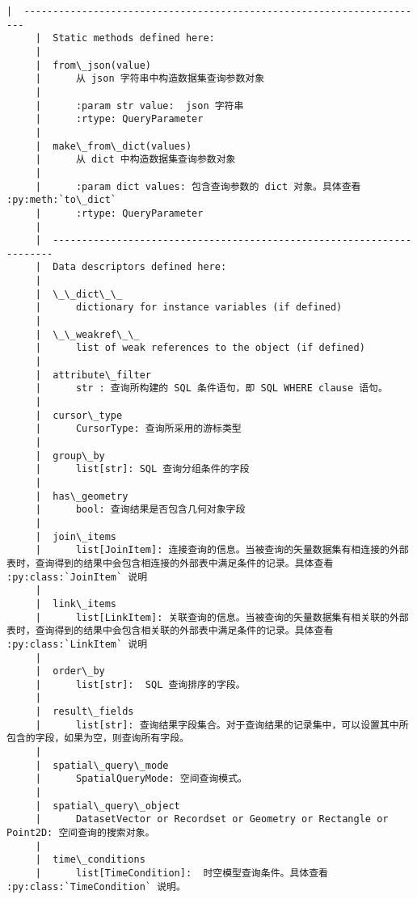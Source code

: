 \documentclass[11pt]{article}
\begin{document}
\begin{Verbatim}[commandchars=\\\{\}]
     |  ----------------------------------------------------------------------
     |  Static methods defined here:
     |  
     |  from\_json(value)
     |      从 json 字符串中构造数据集查询参数对象
     |      
     |      :param str value:  json 字符串
     |      :rtype: QueryParameter
     |  
     |  make\_from\_dict(values)
     |      从 dict 中构造数据集查询参数对象
     |      
     |      :param dict values: 包含查询参数的 dict 对象。具体查看 :py:meth:`to\_dict`
     |      :rtype: QueryParameter
     |  
     |  ----------------------------------------------------------------------
     |  Data descriptors defined here:
     |  
     |  \_\_dict\_\_
     |      dictionary for instance variables (if defined)
     |  
     |  \_\_weakref\_\_
     |      list of weak references to the object (if defined)
     |  
     |  attribute\_filter
     |      str : 查询所构建的 SQL 条件语句，即 SQL WHERE clause 语句。
     |  
     |  cursor\_type
     |      CursorType: 查询所采用的游标类型
     |  
     |  group\_by
     |      list[str]: SQL 查询分组条件的字段
     |  
     |  has\_geometry
     |      bool: 查询结果是否包含几何对象字段
     |  
     |  join\_items
     |      list[JoinItem]: 连接查询的信息。当被查询的矢量数据集有相连接的外部表时，查询得到的结果中会包含相连接的外部表中满足条件的记录。具体查看 :py:class:`JoinItem` 说明
     |  
     |  link\_items
     |      list[LinkItem]: 关联查询的信息。当被查询的矢量数据集有相关联的外部表时，查询得到的结果中会包含相关联的外部表中满足条件的记录。具体查看 :py:class:`LinkItem` 说明
     |  
     |  order\_by
     |      list[str]:  SQL 查询排序的字段。
     |  
     |  result\_fields
     |      list[str]: 查询结果字段集合。对于查询结果的记录集中，可以设置其中所包含的字段，如果为空，则查询所有字段。
     |  
     |  spatial\_query\_mode
     |      SpatialQueryMode: 空间查询模式。
     |  
     |  spatial\_query\_object
     |      DatasetVector or Recordset or Geometry or Rectangle or Point2D: 空间查询的搜索对象。
     |  
     |  time\_conditions
     |      list[TimeCondition]:  时空模型查询条件。具体查看 :py:class:`TimeCondition` 说明。
    

\end{Verbatim}
\end{document}
